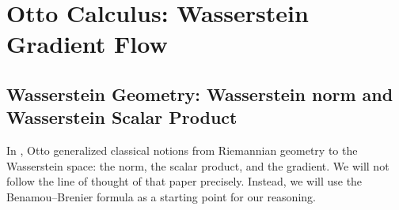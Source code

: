 \documentclass[11pt]{book}
\begin{document}
\section[Otto Calculus]{Otto Calculus: Wasserstein Gradient Flow}




\subsection{Wasserstein Geometry: Wasserstein norm and Wasserstein Scalar Product}

In \cite{otto2001geometry}, Otto generalized classical notions from Riemannian geometry to the Wasserstein space: the norm, the scalar product, and the gradient. We will not follow the line of thought of that paper precisely. Instead, we will use the Benamou--Brenier formula as a starting point for our reasoning.
\end{document}

